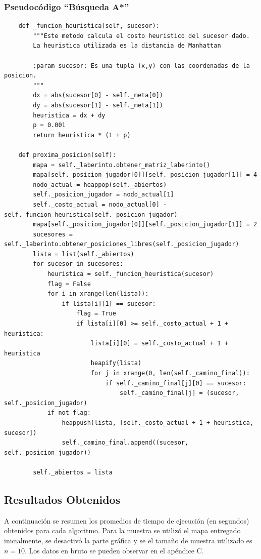 \documentclass[letter, titlepage, 10pt]{article}
\begin{document}
\subsubsection{Pseudocódigo ``Búsqueda A*''}
\begin{lstlisting}
    def _funcion_heuristica(self, sucesor):
        """Este metodo calcula el costo heuristico del sucesor dado.
        La heuristica utilizada es la distancia de Manhattan

        :param sucesor: Es una tupla (x,y) con las coordenadas de la posicion.
        """
        dx = abs(sucesor[0] - self._meta[0])
        dy = abs(sucesor[1] - self._meta[1])
        heuristica = dx + dy
        p = 0.001
        return heuristica * (1 + p)

    def proxima_posicion(self):
        mapa = self._laberinto.obtener_matriz_laberinto()
        mapa[self._posicion_jugador[0]][self._posicion_jugador[1]] = 4
        nodo_actual = heappop(self._abiertos)
        self._posicion_jugador = nodo_actual[1]
        self._costo_actual = nodo_actual[0] - self._funcion_heuristica(self._posicion_jugador)
        mapa[self._posicion_jugador[0]][self._posicion_jugador[1]] = 2
        sucesores = self._laberinto.obtener_posiciones_libres(self._posicion_jugador)
        lista = list(self._abiertos)
        for sucesor in sucesores:
            heuristica = self._funcion_heuristica(sucesor)
            flag = False
            for i in xrange(len(lista)):
                if lista[i][1] == sucesor:
                    flag = True
                    if lista[i][0] >= self._costo_actual + 1 + heuristica:
                        lista[i][0] = self._costo_actual + 1 + heuristica
                        heapify(lista)
                        for j in xrange(0, len(self._camino_final)):
                            if self._camino_final[j][0] == sucesor:
                                self._camino_final[j] = (sucesor, self._posicion_jugador)
            if not flag:
                heappush(lista, [self._costo_actual + 1 + heuristica, sucesor])
                self._camino_final.append((sucesor, self._posicion_jugador))

        self._abiertos = lista
\end{lstlisting}


\newpage
\subsection{Resultados Obtenidos}
A continuación se resumen los promedios de tiempo de ejecución (en segundos) obtenidos para cada algoritmo. Para la muestra se utilizó el mapa entregado inicialmente, se desactivó la parte gráfica y se el tamaño de muestra utilizado es $n = 10$. Los datos en bruto se pueden observar en el apéndice C.
\end{document}
